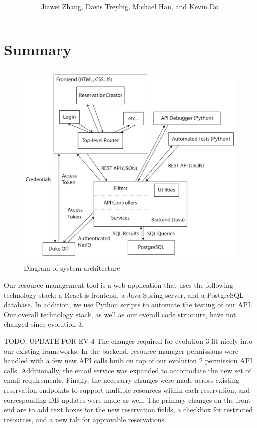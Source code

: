 \documentclass[12pt]{article}
\title{\horrule{5pt}\\\vspace{0.4cm}{\bf \mytitle}\\}
\author{Jiawei Zhang, Davis Treybig, Michael Han, and Kevin Do}
\date{\horrule{1pt}}
\begin{document}
\maketitle{}
\section{Summary}
\begin{figure}[h]
\begin{center}
\includegraphics[height=4in]{../ev2/ev2_design_cropped.pdf}
\end{center}
\caption{Diagram of system architecture}
\label{fig:design}
\end{figure}

Our resource management tool is a web application that uses the following technology stack: a React.js frontend, a Java Spring server, and a PostgreSQL database. In addition, we use Python scripts to automate the testing of our API. Our overall technology stack, as well as our overall code structure, have not changed since evolution 3. 

TODO: UPDATE FOR EV 4
The changes required for evolution 3 fit nicely into our existing frameworks. In the backend, resource manager permissions were handled with a few new API calls built on top of our evolution 2 permission API calls. Additionally, the email service was expanded to accomodate the new set of email requirements. Finally, the necesarry changes were made across existing reservation endpoints to support multiple resources within each reservation, and corresponding DB updates were made as well. The primary changes on the front-end are to add text boxes for the new reservation fields, a checkbox for restricted resources, and a new tab for approvable reservations.
\end{document}
